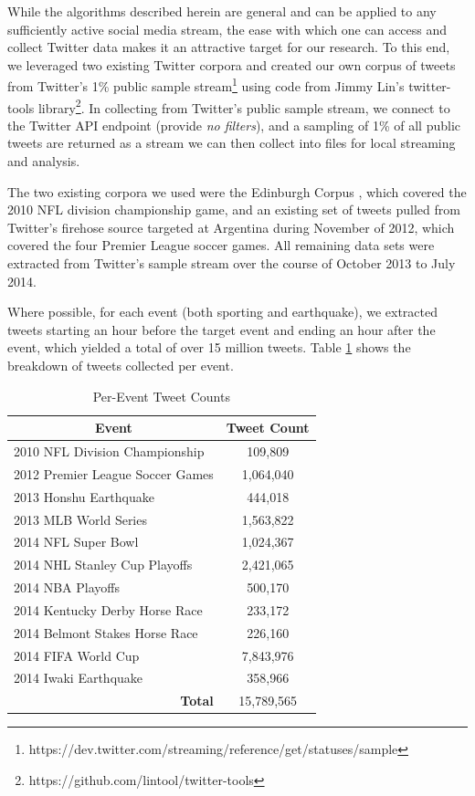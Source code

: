 \documentclass[letterpaper]{article}
\begin{document}
While the algorithms described herein are general and can be applied to any sufficiently active social media stream, the ease with which one can access and collect Twitter data makes it an attractive target for our research.
To this end, we leveraged two existing Twitter corpora and created our own corpus of tweets from Twitter's 1\% public sample stream\footnote{https://dev.twitter.com/streaming/reference/get/statuses/sample} using code from Jimmy Lin's twitter-tools library\footnote{https://github.com/lintool/twitter-tools}.
In collecting from Twitter's public sample stream, we connect to the Twitter API endpoint (provide \emph{no filters}), and a sampling of 1\% of all public tweets are returned as a stream we can then collect into files for local streaming and analysis.

The two existing corpora we used were the Edinburgh Corpus \cite{Petrovic:2010:ETC:1860667.1860680}, which covered the 2010 NFL division championship game, and an existing set of tweets pulled from Twitter's firehose source targeted at Argentina during November of 2012, which covered the four Premier League soccer games.
All remaining data sets were extracted from Twitter's sample stream over the course of October 2013 to July 2014.

Where possible, for each event (both sporting and earthquake), we extracted tweets starting an hour before the target event and ending an hour after the event, which yielded a total of over 15 million tweets.
Table \ref{tab:tweetCounts} shows the breakdown of tweets collected per event.

\begin{table}[htdp]
\footnotesize
\caption{Per-Event Tweet Counts}
\begin{center}
\begin{tabular}{|p{2in}|c|}
\hline
\multicolumn{1}{|c|}{\textbf{Event}} & \textbf{Tweet Count} \\ \hline
2010 NFL Division Championship & 109,809 \\ \hline
2012 Premier League Soccer Games & 1,064,040 \\ \hline
2013 Honshu Earthquake  & 444,018 \\ \hline
2013 MLB World Series  & 1,563,822 \\ \hline
2014 NFL Super Bowl & 1,024,367 \\ \hline
2014 NHL Stanley Cup Playoffs & 2,421,065 \\ \hline
2014 NBA Playoffs & 500,170 \\ \hline
2014 Kentucky Derby Horse Race & 233,172 \\ \hline
2014 Belmont Stakes Horse Race & 226,160 \\ \hline
2014 FIFA World Cup & 7,843,976 \\ \hline
2014 Iwaki Earthquake  & 358,966 \\ \hline
\multicolumn{1}{|r|}{\textbf{Total}} &  15,789,565  \\ \hline
\end{tabular}
\end{center}
\label{tab:tweetCounts}
\end{table}
\end{document}
